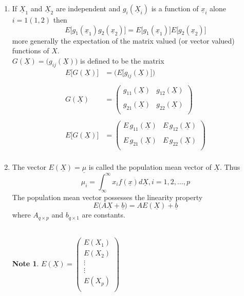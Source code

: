 \documentclass[11pt,a4paper]{article}
\theoremstyle{definition}
\newtheorem{note}[thm]{Note}
\begin{document}
\begin{enumerate}
\begin{enumerate}
        \item If $\underline{X}_1$ and $\underline{X}_2$ are independent and $g_i(\underline{X}_i)$ is a function of $\underline{x}_i$ alone $i=1(1,2)$ then $$E\big[g_1(\underline{x}_1)g_2(\underline{x}_2)\big] = E\big[g_1(\underline{x}_1)\big]E\big[g_2(\underline{x}_2)\big]$$ more generally the expectation of the matrix valued (or vector valued) functions of $X$.\\
        $G(\underline{X}) = \Big(g_{ij}(\underline{X})\Big)$ is defined to be the matrix
\begin{align*}
E\big[G(\underline{X})\big] & = \Bigg(E\big[g_{ij}(\underline{X})\big]\Bigg)\\\\
G(\underline{X}) & = \begin{pmatrix}
g_{11}(\underline{X}) & g_{12}(\underline{X})\\\\
g_{21}(\underline{X}) & g_{22}(\underline{X})\\
\end{pmatrix}\\\\
E\big[G(\underline{X})\big] &  = \begin{pmatrix}
E\, g_{11}(\underline{X}) & E\, g_{12}(\underline{X})\\
                                      & \\
E\, g_{21}(\underline{X}) & E\, g_{22} (\underline{X})\\
\end{pmatrix}\\
\end{align*}

             \item The vector $E(\underline{X}) = \underline{\mu}$ is called the population mean vector of $\underline{X}$. Thus $$\mu_i = \int^{\infty} _{\infty} x_i f(\underline{x}) d\underline{X},  i = 1,2,\ldots, p$$ The population mean vector possesses the linearity property $$E\big(A\underline{X} + \underline{b}\big) = AE(\underline{X}) + \underline{b}$$
             where $A_{q\times p}$ and $b_{q\times 1}$ are constants.\\\\
             
\begin{note}
$\displaystyle{E(\underline{X}) =
\begin{pmatrix}
E(X_1)\\
E(X_2)\\
\vdots\\
\vdots\\
E(X_p)\\
\end{pmatrix}
}$\\
\end{note}



\end{enumerate}
\end{enumerate}
\end{document}
